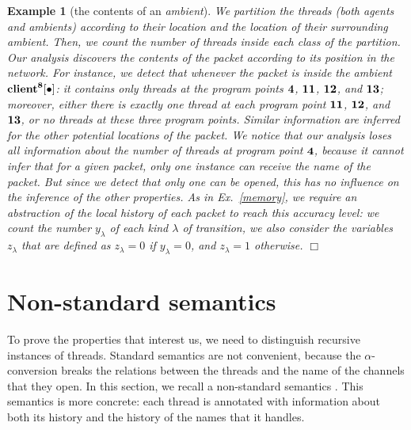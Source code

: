 \documentclass{article}
\newcommand{\boxexample}{$\Box$}
\newtheorem{example}[thm]{Example}
\newcommand{\ambient}{\emph{ambient}}
\newcommand{\ambients}{\emph{ambients}}
\newcommand{\pp}[1]{$\bf{#1}$}
\newcommand{\globalname}[1]{\mathrm{#1}}
\newcommand{\amblabd}{4}
\newcommand{\amblabh}{8}
\newcommand{\amblabk}{11}
\newcommand{\amblabl}{12}
\newcommand{\amblabm}{13}
\newcommand{\bfclient}{\globalname{\bf client}}
\begin{document}
\begin{example}[the contents of an \ambient]
We partition the threads (both agents and \ambients) according to their location and the location of their surrounding \ambient. 
Then, we count the number of threads inside each class of the partition.
Our analysis discovers   the contents of the packet according to its position in the network. 
For instance, we detect that whenever the packet is inside the \ambient\ ${\bf \bfclient^{\amblabh}[\bullet]}$: 
it contains only threads at the program points \pp{\amblabd}, \pp{\amblabk}, \pp{\amblabl}, and \pp{\amblabm}; 
moreover, either there is exactly one thread 
at each program point \pp{\amblabk}, \pp{\amblabl}, and \pp{\amblabm}, or 
no threads at these three program points.
Similar information are inferred for the other potential locations of the packet.
We notice that our analysis loses all information about the number of threads at program point \pp{\amblabd}, because it cannot infer that for a given packet, only one instance can receive the name of the packet. But since we detect that only one can be opened, this has no influence on the inference of the other properties.
As in Ex.~\ref{memory}, we require an abstraction of the local history of each packet to reach this accuracy level:
we count the number $y_{\lambda}$ of each kind $\lambda$ of transition,
 we also consider the variables $z_{\lambda}$ that are defined as $z_{\lambda}=0$ if $y_{\lambda}=0$, and $z_{\lambda}=1$ otherwise. \boxexample
\end{example}

\section{Non-standard semantics}
\label{non-stan}

To prove the properties that interest us, we need to distinguish recursive instances of threads. 
Standard semantics are not convenient, because the $\alpha$-conversion breaks the relations between the threads and the name of the channels that they open. In this section, we recall a non-standard semantics \cite{feret:sas2000,feret:jlap,feret:thesis}. This semantics is more concrete: each thread is annotated with information about both its history and the history of the names that it handles. 
\end{document}
